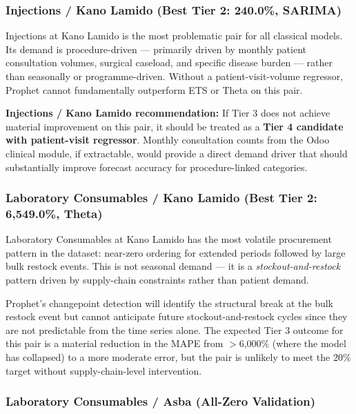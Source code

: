 \documentclass[12pt, a4paper]{article}
\begin{document}
\subsubsection{Injections / Kano Lamido (Best Tier 2: 240.0\%, SARIMA)}

Injections at Kano Lamido is the most problematic pair for all classical
models. Its demand is procedure-driven --- primarily driven by monthly
patient consultation volumes, surgical caseload, and specific disease
burden --- rather than seasonally or programme-driven. Without a
patient-visit-volume regressor, Prophet cannot fundamentally outperform
ETS or Theta on this pair.

\begin{mdframed}[style=alertbox]
\textbf{Injections / Kano Lamido recommendation:} If Tier 3 does not
achieve material improvement on this pair, it should be treated as a
\textbf{Tier 4 candidate with patient-visit regressor}. Monthly
consultation counts from the Odoo clinical module, if extractable,
would provide a direct demand driver that should substantially improve
forecast accuracy for procedure-linked categories.
\end{mdframed}

\subsubsection{Laboratory Consumables / Kano Lamido (Best Tier 2: 6,549.0\%, Theta)}

Laboratory Consumables at Kano Lamido has the most volatile procurement
pattern in the dataset: near-zero ordering for extended periods followed
by large bulk restock events. This is not seasonal demand --- it is
a \textit{stockout-and-restock} pattern driven by supply-chain
constraints rather than patient demand.

Prophet's changepoint detection will identify the structural break at
the bulk restock event but cannot anticipate future stockout-and-restock
cycles since they are not predictable from the time series alone. The
expected Tier 3 outcome for this pair is a material reduction in the
MAPE from $>$6,000\% (where the model has collapsed) to a more moderate
error, but the pair is unlikely to meet the 20\% target without
supply-chain-level intervention.

\subsubsection{Laboratory Consumables / Asba (All-Zero Validation)}
\end{document}
